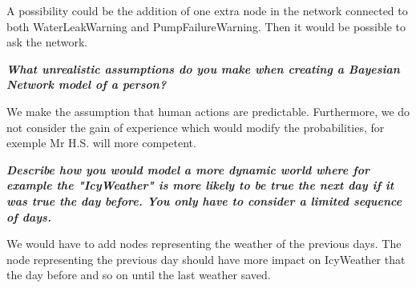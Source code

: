 \vspace{1em}
A possibility could be the addition of one extra node in the network connected
to both WaterLeakWarning and PumpFailureWarning. Then it would be possible to ask
the network.


\textit{\textbf{What unrealistic assumptions do you make when creating a
Bayesian Network model of a person?}}

\vspace{1em}
We make the assumption that human actions are predictable. Furthermore, we do not
consider the gain of experience which would modify the probabilities, for exemple
Mr H.S. will more competent.

\textit{\textbf{Describe how you would model a more dynamic world where for
 example the "IcyWeather" is more likely to be true the next day if it was
 true the day before. You only have to consider a limited sequence of days.}}

 \vspace{1em}
We would have to add nodes representing the weather of the previous days.
The node representing the previous day should have more impact on IcyWeather that
the day before and so on until the last weather saved.
\thispagestyle{empty}

\newpage
\thispagestyle{empty}
